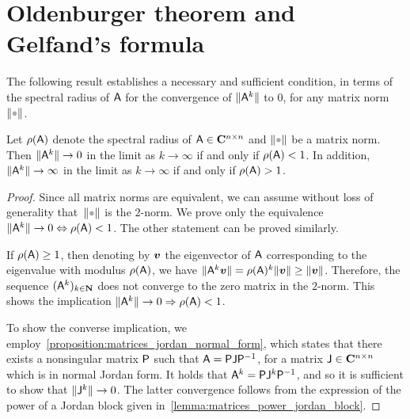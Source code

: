 \section{Oldenburger theorem and Gelfand's formula}
The following result establishes a necessary and sufficient condition,
in terms of the spectral radius of $\mathsf A$ for the convergence of $\lVert\mathsf A^k\rVert$ to 0,
for any matrix norm $\norm{\placeholder}$.
\begin{proposition}
    [Oldenburger]
    \label{proposition:matrices_convergence_power_of_matrix}
    Let $\rho(\mathsf A)$ denote the spectral radius of $\mathsf A \in \mathbf C^{n \times n}$ and $\norm{\placeholder}$ be a matrix norm.
    Then $\lVert\mathsf A^k\rVert \to 0$ in the limit as $k \to \infty$ if and only if $\rho(\mathsf A) < 1$.
    In addition, $\lVert\mathsf A^k\rVert \to \infty$ in the limit as $k \to \infty$ if and only if $\rho(\mathsf A) > 1$.
\end{proposition}
\begin{proof}
    Since all matrix norms are equivalent,
    we can assume without loss of generality that~$\norm{\placeholder}$ is the 2-norm.
    We prove only the equivalence $\lVert\mathsf A^k\rVert \to 0 \Leftrightarrow \rho(\mathsf A) < 1$.
    The other statement can be proved similarly.

    If $\rho(\mathsf A) \geq 1$,
    then denoting by $\mathbf{\boldsymbol{v}}$ the eigenvector of $\mathsf A$ corresponding to the eigenvalue with modulus $\rho(\mathsf A)$,
    we have $\lVert\mathsf A^k \mathbf{\boldsymbol{v}}\rVert = \rho(\mathsf A)^k \lVert\mathbf{\boldsymbol{v}}\rVert \geq \lVert\mathbf{\boldsymbol{v}}\rVert$.
    Therefore, the sequence $(\mathsf A^k)_{k \in \mathbf N}$ does not converge to the zero matrix in the $2$-norm.
    This shows the implication $\lVert\mathsf A^k\rVert \to 0 \Rightarrow \rho(\mathsf A) < 1$.

    To show the converse implication,
    we employ~\cref{proposition:matrices_jordan_normal_form},
    which states that there exists a nonsingular matrix $\mathsf P$ such that $\mathsf A = \mathsf P \mathsf J \mathsf P^{-1}$,
    for a matrix $\mathsf J \in \mathbf C^{n \times n}$ which is in normal Jordan form.
    It holds that $\mathsf A^k = \mathsf P \mathsf J^k \mathsf P^{-1}$,
    and so it is sufficient to show that $\lVert\mathsf J^k\rVert \to 0$.
    The latter convergence follows from the expression of the power of a Jordan block given in~\cref{lemma:matrices_power_jordan_block}.
\end{proof}

